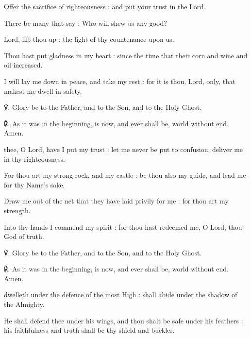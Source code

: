 \begin{multicols}{2}
Offer the sacrifice of righteousness : and put your trust in the Lord.\par
{}There be many that say : Who will shew us any good?\par
{}Lord, lift thou up : the light of thy countenance upon us.\par
{}Thou hast put gladness in my heart : since the time that their corn and wine and oil increased.\par
{}I will lay me down in peace, and take my rest : for it is thou, Lord, only, that makest me dwell in safety.\par
℣. Glory be to the Father, and to the Son, and to the Holy Ghost.\par
℟. As it was in the beginning, is now, and ever shall be, world without end. Amen.
\par
{}
 thee, O Lord, have I put my trust : let me never be put to confusion, deliver me in thy righteousness.\par
{}
For thou art my strong rock, and my castle : be thou also my guide, and lead me for thy Name's sake.\par
{}Draw me out of the net that they have laid privily for me : for thou art my strength.\par
{}Into thy hands I commend my spirit : for thou hast redeemed me, O Lord, thou God of truth.\par
℣. Glory be to the Father, and to the Son, and to the Holy Ghost.\par
℟. As it was in the beginning, is now, and ever shall be, world without end. Amen.
\par
{}
 dwelleth under the defence of the most High : shall abide under the shadow of the Almighty.\par
{}
He shall defend thee under his wings, and thou shalt be safe under his feathers : his faithfulness and truth shall be thy shield and buckler.\par

\end{multicols}
